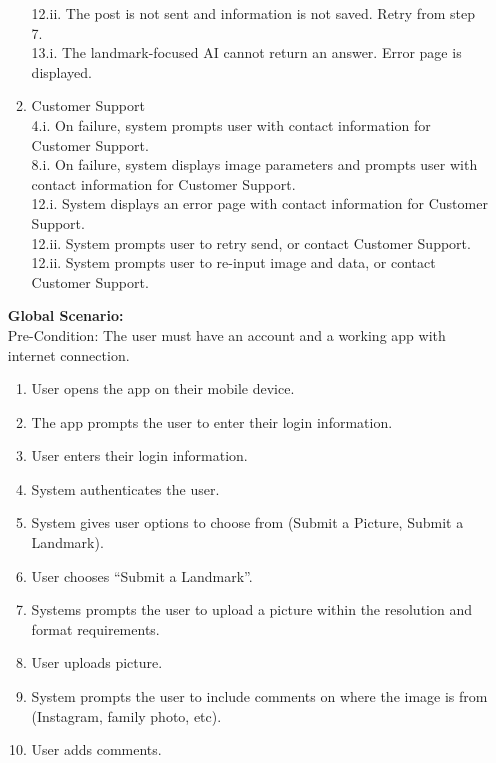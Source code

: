 \documentclass[]{article}
\begin{document}
\begin{enumerate}[{\bf BE1.}]
\begin{enumerate}[{\bf VP1.}]
                    12.ii. The post is not sent and information is not saved. Retry from step 7. \\
                    13.i. The landmark-focused AI cannot return an answer. Error page is displayed. \\
			\item Customer Support \\
				4.i. On failure, system prompts user with contact          information for Customer Support. \\
                    8.i. On failure, system displays image parameters and prompts user with contact information for Customer Support. \\
                    12.i. System displays an error page with contact information for Customer Support. \\
	            12.ii. System prompts user to retry send, or contact       Customer Support. \\
	            12.ii. System prompts user to re-input image and data,     or contact Customer Support. \\ 
		\end{enumerate}
		{\bf Global Scenario:}\\
            Pre-Condition: The user must have an account and a working app with internet connection. 
		      \begin{enumerate}[{1.}]
                    \item User opens the app on their mobile device. 
                    \item The app prompts the user to enter their login information.
                    \item User enters their login information.
                    \item System authenticates the user. 
                    \item System gives user options to choose from (Submit a Picture, Submit a Landmark).  
                    \item User chooses “Submit a Landmark”. 
                    \item Systems prompts the user to upload a picture within the resolution and format requirements.
                    \item User uploads picture.
                    \item System prompts the user to include comments on where the image is from (Instagram, family photo, etc). 
                    \item User adds comments.

\end{enumerate}
\end{enumerate}
\end{document}
